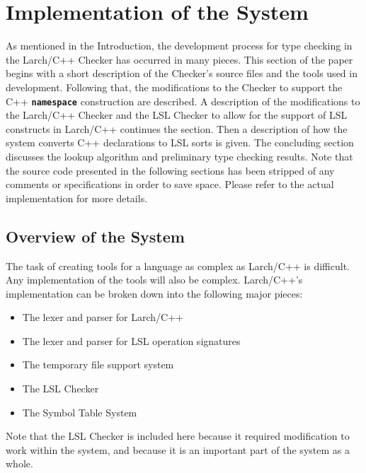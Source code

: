 \documentclass[12pt]{article} %
\newcommand{\reserved}[1]{\textbf{\texttt{#1}}} %
\begin{document}
%
\section{Implementation of the System} 
As mentioned in the
Introduction, the development process for type checking in the
Larch/C++ Checker has occurred in many pieces. This section of the
paper begins with a short description of the Checker's source files
and the tools used in development. Following that, the modifications to
the Checker to support the C++ \reserved{namespace} construction are
described. A description of the modifications to the Larch/C++ Checker
and the LSL Checker to allow for the support of LSL constructs in
Larch/C++ continues the section. Then a description of how
the system converts C++ declarations to LSL sorts is given. The
concluding section discusses the lookup algorithm and preliminary type
checking results. Note that the source code presented in the following
sections has been stripped of any comments or specifications in order to save
space. Please refer to the actual implementation for more details.

\subsection{Overview of the System}
The task of creating tools for a language as complex as Larch/C++ is
difficult. Any implementation of the tools will also be complex.
Larch/C++'s implementation can be broken down into the following major pieces:
\begin{itemize}

\item The lexer and parser for Larch/C++
\item The lexer and parser for LSL operation signatures
\item The temporary file support system
\item The LSL Checker
\item The Symbol Table System

\end{itemize}

Note that the LSL Checker is included here because it required
modification to work within the system, and because it is an important 
part of the system as a whole.
 
\end{document}
